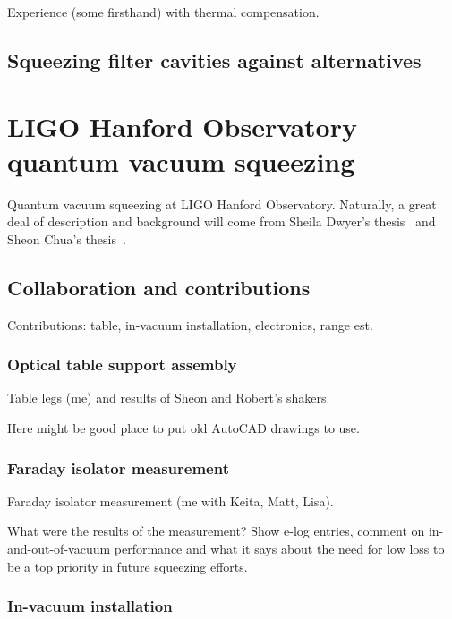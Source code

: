             Experience (some firsthand) with thermal compensation.

        \subsection{Squeezing filter cavities against alternatives}
        \label{third-gen_squeezing}

    \section{LIGO Hanford Observatory quantum vacuum squeezing}
    \label{LHO_squeeze}

        Quantum vacuum squeezing at LIGO Hanford Observatory. Naturally, a great deal of description and background will come from Sheila Dwyer's thesis~\cite{DwyerThesis} and Sheon Chua's thesis~\cite{ChuaThesis}.

        \subsection{Collaboration and contributions}
        \label{contributions}

            Contributions: table, in-vacuum installation, electronics, range est.

            \subsubsection{Optical table support assembly}
            \label{table_legs}

                Table legs (me) and results of Sheon and Robert's shakers.

		Here might be good place to put old AutoCAD drawings to use.

            \subsubsection{Faraday isolator measurement}
            \label{Faraday}

                Faraday isolator measurement (me with Keita, Matt, Lisa).

		What were the results of the measurement? Show e-log entries, comment on in-and-out-of-vacuum performance and what it says about the need for low loss to be a top priority in future squeezing efforts.

            \subsubsection{In-vacuum installation}
            \label{In-vacuum}

